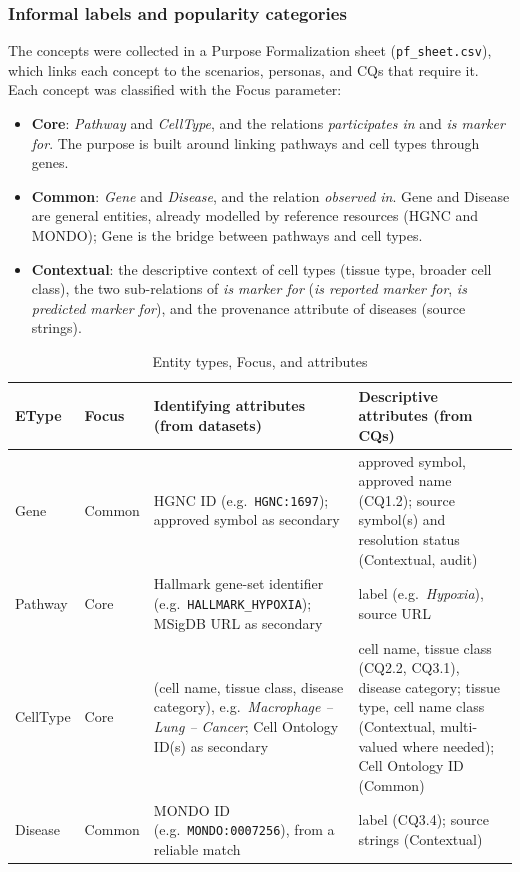 \subsubsection{Informal labels and popularity categories}

The concepts were collected in a Purpose Formalization sheet (\texttt{pf\_sheet.csv}), which links each concept to the scenarios, personas, and CQs that require it. Each concept was classified with the Focus parameter:
\begin{itemize}
    \item \textbf{Core}: \emph{Pathway} and \emph{CellType}, and the relations \emph{participates in} and \emph{is marker for}. The purpose is built around linking pathways and cell types through genes.
    \item \textbf{Common}: \emph{Gene} and \emph{Disease}, and the relation \emph{observed in}. Gene and Disease are general entities, already modelled by reference resources (HGNC and MONDO); Gene is the bridge between pathways and cell types.
    \item \textbf{Contextual}: the descriptive context of cell types (tissue type, broader cell class), the two sub-relations of \emph{is marker for} (\emph{is reported marker for}, \emph{is predicted marker for}), and the provenance attribute of diseases (source strings).
\end{itemize}

\begin{table}[htbp]
\centering
\small
\begin{tabularx}{\linewidth}{|l|l|X|X|}
\hline
\textbf{EType} & \textbf{Focus} & \textbf{Identifying attributes (from datasets)} & \textbf{Descriptive attributes (from CQs)} \\ \hline
Gene & Common & HGNC ID (e.g.\ \texttt{HGNC:1697}); approved symbol as secondary & approved symbol, approved name (CQ1.2); source symbol(s) and resolution status (Contextual, audit) \\ \hline
Pathway & Core & Hallmark gene-set identifier (e.g.\ \texttt{HALLMARK\_HYPOXIA}); MSigDB URL as secondary & label (e.g.\ \emph{Hypoxia}), source URL \\ \hline
CellType & Core & (cell name, tissue class, disease category), e.g.\ \emph{Macrophage -- Lung -- Cancer}; Cell Ontology ID(s) as secondary & cell name, tissue class (CQ2.2, CQ3.1), disease category; tissue type, cell name class (Contextual, multi-valued where needed); Cell Ontology ID (Common) \\ \hline
Disease & Common & MONDO ID (e.g.\ \texttt{MONDO:0007256}), from a reliable match & label (CQ3.4); source strings (Contextual) \\ \hline
\end{tabularx}
\caption{Entity types, Focus, and attributes}
\label{tab:etypes}
\end{table}


